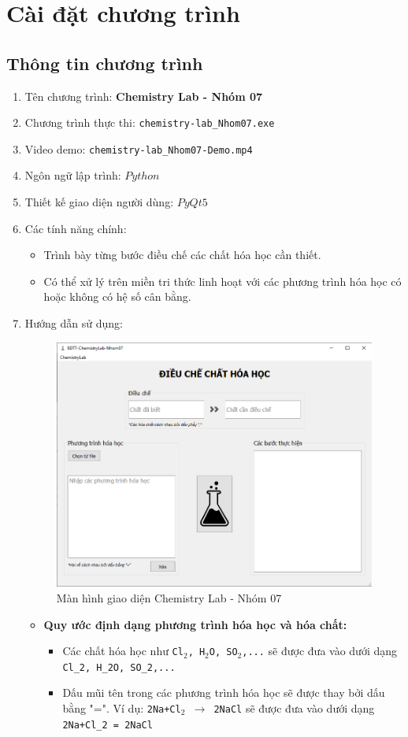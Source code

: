 \documentclass[a4paper]{article}
\begin{document}
	\section{Cài đặt chương trình}
	\subsection{Thông tin chương trình}
		\begin{enumerate}
		\item Tên chương trình: \textbf{Chemistry Lab - Nhóm 07}
		\item Chương trình thực thi: \texttt{chemistry-lab\_Nhom07.exe}
		\item Video demo: \texttt{chemistry-lab\_Nhom07-Demo.mp4}
		\item Ngôn ngữ lập trình: $Python$
		\item Thiết kế giao diện người dùng: $PyQt5$
		\item Các tính năng chính:
		\begin{itemize}
			\item Trình bày từng bước điều chế các chất hóa học cần thiết.
			\item Có thể xử lý trên miền tri thức linh hoạt với các phương trình hóa học có hoặc không có hệ số cân bằng.
		\end{itemize}
		\item Hướng dẫn sử dụng:
		\begin{figure}[h]
			\centering
			\includegraphics[width=0.7\linewidth]{images/app-ui}
			\caption{Màn hình giao diện Chemistry Lab - Nhóm 07}
			\label{fig:app-ui}
		\end{figure}
		\begin{itemize}
			\item \textbf{Quy ước định dạng phương trình hóa học và hóa chất:} 
			\begin{itemize}
				\item Các chất hóa học như \texttt{Cl$_2$, H$_2$O, SO$_2$,...} sẽ được đưa vào dưới dạng \texttt{Cl\_2, H\_2O, SO\_2,...}
				\item Dấu mũi tên trong các phương trình hóa học sẽ được thay bởi dấu bằng "=". Ví dụ: \texttt{2Na+Cl$_2$ $\rightarrow$ 2NaCl} sẽ được đưa vào dưới dạng \texttt{2Na+Cl\_2 = 2NaCl}
			\end{itemize}
		

\end{itemize}
\end{enumerate}
\end{document}
